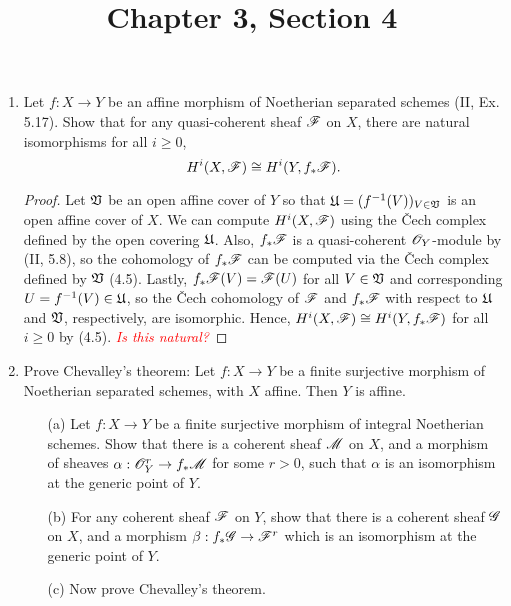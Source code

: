 \documentclass[a4paper]{article}
\title{Chapter 3, Section 4}
\begin{document}
\maketitle
\begin{enumerate} [label=\textbf{\arabic*.}, leftmargin=0em]

\item Let $f : X \to Y$ be an affine morphism of Noetherian separated schemes (II, Ex. 5.17).
Show that for any quasi-coherent sheaf $\mathscr{F}$ on $X$, there are natural isomorphisms for all $i \geq 0$,
\begin{equation*}
  H^i(X, \mathscr{F}) \cong H^i(Y, f_* \mathscr{F}).
\end{equation*}

\begin{proof}
  Let $\mathfrak{V}$ be an open affine cover of $Y$ so that $\mathfrak{U} = (f^{-1}(V))_{V \in \mathfrak{V}}$ is an open affine cover of $X$.
  We can compute $H^i(X, \mathscr{F})$ using the Čech complex defined by the open covering $\mathfrak{U}$.
  Also, $f_*\mathscr{F}$ is a quasi-coherent $\mathscr{O}_Y$-module by (II, 5.8), so the cohomology of $f_*\mathscr{F}$ can be computed via the Čech complex defined by $\mathfrak{V}$ (4.5).
  Lastly, $f_*\mathscr{F}(V) = \mathscr{F}(U)$ for all $V \in \mathfrak{V}$ and corresponding $U = f^{-1}(V) \in \mathfrak{U}$, so the Čech cohomology of $\mathscr{F}$ and $f_*\mathscr{F}$ with respect to $\mathfrak{U}$ and $\mathfrak{V}$, respectively, are isomorphic.
  Hence, $H^i(X, \mathscr{F}) \cong H^i(Y, f_*\mathscr{F})$ for all $i \geq 0$ by (4.5).
  \textcolor{red}{\textit{Is this natural?}}
\end{proof}

\item Prove Chevalley's theorem: Let $f : X \to Y$ be a finite surjective morphism of Noetherian separated schemes, with $X$ affine.
Then $Y$ is affine.
\begin{itemize}
  \item[(a)] Let $f : X \to Y$ be a finite surjective morphism of integral Noetherian schemes.
  Show that there is a coherent sheaf $\mathscr{M}$ on $X$, and a morphism of sheaves $\alpha : \mathscr{O}_Y^r \to f_* \mathscr{M}$ for some $r > 0$, such that $\alpha$ is an isomorphism at the generic point of $Y$.

  \item[(b)] For any coherent sheaf $\mathscr{F}$ on $Y$, show that there is a coherent sheaf $\mathscr{G}$ on $X$, and a morphism $\beta : f_* \mathscr{G} \to \mathscr{F}^r$ which is an isomorphism at the generic point of $Y$. 

  \item[(c)] Now prove Chevalley's theorem.
\end{itemize}


\end{enumerate}
\end{document}

